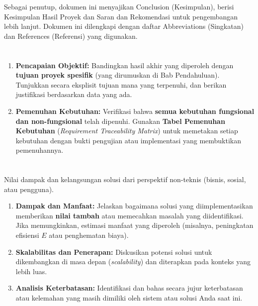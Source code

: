 \documentclass{elsinta}
\begin{document}
Sebagai penutup, dokumen ini menyajikan Conclusion (Kesimpulan), berisi Kesimpulan Hasil Proyek dan Saran dan Rekomendasi untuk pengembangan lebih lanjut. Dokumen ini dilengkapi dengan daftar Abbreviations (Singkatan) dan References (Referensi) yang digunakan.

\newpage
\section{\RelevanceObjectivesTitle}


\begin{enumerate}
    \item \textbf{Pencapaian Objektif:} Bandingkan hasil akhir yang diperoleh dengan \textbf{tujuan proyek spesifik} (yang dirumuskan di Bab Pendahuluan). Tunjukkan secara eksplisit tujuan mana yang terpenuhi, dan berikan justifikasi berdasarkan data yang ada.
    \item \textbf{Pemenuhan Kebutuhan:} Verifikasi bahwa \textbf{semua kebutuhan fungsional dan non-fungsional} telah dipenuhi. Gunakan \textbf{Tabel Pemenuhan Kebutuhan} (\textit{Requirement Traceability Matrix}) untuk memetakan setiap kebutuhan dengan bukti pengujian atau implementasi yang membuktikan pemenuhannya.
\end{enumerate}




\section{\BusinessFeasibilityTitle}



Nilai dampak dan kelangsungan solusi dari perspektif non-teknis (bisnis, sosial, atau pengguna).

\begin{enumerate}
    \item \textbf{Dampak dan Manfaat:} Jelaskan bagaimana solusi yang diimplementasikan memberikan \textbf{nilai tambah} atau memecahkan masalah yang diidentifikasi. Jika memungkinkan, estimasi manfaat yang diperoleh (misalnya, peningkatan efisiensi $E$ atau penghematan biaya).
    \item \textbf{Skalabilitas dan Penerapan:} Diskusikan potensi solusi untuk dikembangkan di masa depan (\textit{scalability}) dan diterapkan pada konteks yang lebih luas.
    \item \textbf{Analisis Keterbatasan:} Identifikasi dan bahas secara jujur keterbatasan atau kelemahan yang masih dimiliki oleh sistem atau solusi Anda saat ini.
\end{enumerate}
\end{document}
